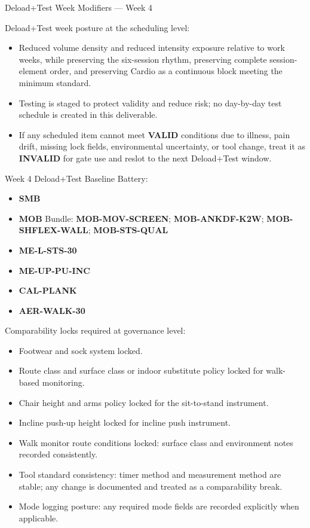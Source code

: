 \documentclass[10pt]{article}
\begin{document}
\begin{landscape}
Deload+Test Week Modifiers — Week 4\par\vspace{0.25em}

Deload+Test week posture at the scheduling level:

\begin{itemize}
\item Reduced volume density and reduced intensity exposure relative to work weeks, while preserving the six-session rhythm, preserving complete session-element order, and preserving Cardio as a continuous block meeting the minimum standard.
\item Testing is staged to protect validity and reduce risk; no day-by-day test schedule is created in this deliverable.
\item If any scheduled item cannot meet \textbf{VALID} conditions due to illness, pain drift, missing lock fields, environmental uncertainty, or tool change, treat it as \textbf{INVALID} for gate use and reslot to the next Deload+Test window.
\end{itemize}

Week 4 Deload+Test Baseline Battery:

\begin{itemize}
\item \textbf{SMB}
\item \textbf{MOB} Bundle: \textbf{MOB-MOV-SCREEN}; \textbf{MOB-ANKDF-K2W}; \textbf{MOB-SHFLEX-WALL}; \textbf{MOB-STS-QUAL}
\item \textbf{ME-L-STS-30}
\item \textbf{ME-UP-PU-INC}
\item \textbf{CAL-PLANK}
\item \textbf{AER-WALK-30}
\end{itemize}

Comparability locks required at governance level:

\begin{itemize}
\item Footwear and sock system locked.
\item Route class and surface class or indoor substitute policy locked for walk-based monitoring.
\item Chair height and arms policy locked for the sit-to-stand instrument.
\item Incline push-up height locked for incline push instrument.
\item Walk monitor route conditions locked: surface class and environment notes recorded consistently.
\item Tool standard consistency: timer method and measurement method are stable; any change is documented and treated as a comparability break.
\item Mode logging posture: any required mode fields are recorded explicitly when applicable.
\end{itemize}


\end{landscape}
\end{document}
